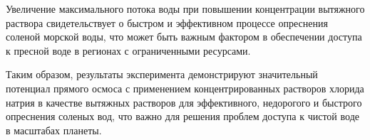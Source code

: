 \begin{multicols}{2}
Увеличение максимального потока воды при повышении концентрации
вытяжного раствора свидетельствует о быстром и эффективном процессе
опреснения соленой морской воды, что может быть важным фактором в
обеспечении доступа к пресной воде в регионах с ограниченными ресурсами.

Таким образом, результаты эксперимента демонстрируют значительный
потенциал прямого осмоса с применением концентрированных растворов
хлорида натрия в качестве вытяжных растворов для эффективного,
недорогого и быстрого опреснения соленых вод, что важно для решения
проблем доступа к чистой воде в масштабах планеты.
\end{multicols}

\begin{table}[H]
\caption*{Таблица 4 - Опреснение морской воды из Каспийского моря с
использованием 25\% NaCl}
\centering
{}
\end{table}
